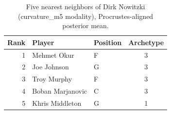 \begin{table}[htbp]
  \centering\small
  \begin{tabular}{rllc}
    \toprule
    Rank & Player & Position & Archetype \\
    \midrule
    1 & Mehmet Okur & F & 3 \\
    2 & Joe Johnson & G & 3 \\
    3 & Troy Murphy & F & 3 \\
    4 & Boban Marjanovic & C & 3 \\
    5 & Khris Middleton & G & 1 \\
    \bottomrule
  \end{tabular}
  \caption{Five nearest neighbors of Dirk Nowitzki (curvature_m5 modality), Procrustes-aligned posterior mean.}
  \label{tab:Dirk_Nowitzki_neighbors_curvature_m5}
\end{table}

